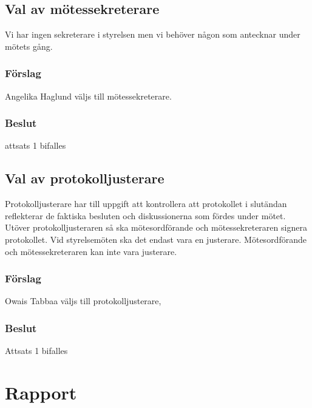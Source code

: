 \documentclass[protokoll]{dvd}
\begin{document}
\subsection{Val av mötessekreterare}
Vi har ingen sekreterare i styrelsen men vi behöver någon som antecknar under mötets gång. 
\subsubsection*{Förslag}
\begin{attsatser}
    \item Angelika Haglund väljs till mötessekreterare. 
\end{attsatser}
\subsubsection*{Beslut}
\begin{attsatser}
    \item attsats 1 bifalles
\end{attsatser}

\subsection{Val av protokolljusterare}

Protokolljusterare har till uppgift att kontrollera att protokollet i slutändan reflekterar de faktiska besluten och diskussionerna som fördes under mötet.
Utöver protokolljusteraren så ska mötesordförande och mötessekreteraren signera protokollet.
Vid styrelsemöten ska det endast vara en justerare.
Mötesordförande och mötessekreteraren kan inte vara justerare.


\subsubsection*{Förslag}
\begin{attsatser}
    \item Owais Tabbaa väljs till protokolljusterare, 
\end{attsatser}
\subsubsection*{Beslut}
\begin{attsatser}
    \item Attsats 1 bifalles
\end{attsatser}

\section{Rapport} 
\end{document}
